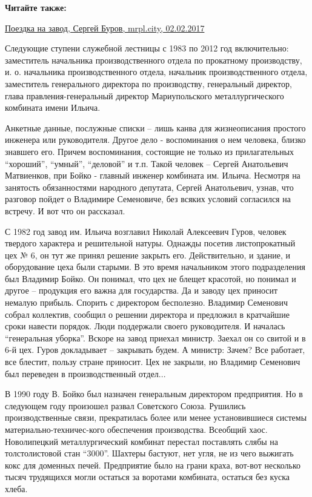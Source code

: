 \textbf{Читайте также:} 

\href{https://archive.org/details/02_02_2017.sergij_burov.mrpl_city.poezdka_na_zavod}{%
Поездка на завод, Сергей Буров, mrpl.city, 02.02.2017}

Следующие ступени служебной лестницы с 1983 по 2012 год включительно:
заместитель начальника производственного отдела по прокатному производству, и.
о. начальника производственного отдела,  начальник производственного отдела,
заместитель генерального директора по производству, генеральный директор, глава
правления-генеральный директор Мариупольского металлургического комбината имени
Ильича.

Анкетные данные, послужные списки – лишь канва для жизнеописания простого
инженера или руководителя. Другое дело - воспоминания о нем человека, близко
знавшего его. Причем воспоминания, состоящие не только из прилагательных
\enquote{хороший}, \enquote{умный}, \enquote{деловой} и т.п. Такой  человек – Сергей Анатольевич
Матвиенков, при Бойко - главный инженер комбината им. Ильича.  Несмотря на
занятость обязанностями народного депутата, Сергей Анатольевич, узнав, что
разговор пойдет о Владимире Семеновиче, без всяких условий согласился на
встречу. И вот что он рассказал.

С 1982 год завод им. Ильича возглавил Николай Алексеевич Гуров, человек
твердого характера и решительной натуры. Однажды посетив листопрокатный цех №
6, он тут же принял решение закрыть его. Действительно, и здание, и
оборудование цеха были старыми. В это время начальником этого подразделения был
Владимир Бойко. Он понимал, что цех не блещет красотой, но понимал и другое –
продукция его важна для государства. Да и заводу цех приносит немалую прибыль.
Спорить с директором бесполезно. Владимир Семенович собрал коллектив, сообщил о
решении директора и предложил в кратчайшие сроки навести порядок. Люди
поддержали своего руководителя. И началась \enquote{генеральная уборка}. Вскоре на
завод приехал министр. Заехал он со свитой и в 6-й цех. Гуров докладывает –
закрывать будем. А министр: Зачем? Все работает, все блестит, пользу стране
приносит. Цех не закрыли, но Владимир Семенович был переведен в
производственный отдел...

В 1990 году В. Бойко был назначен генеральным директором предприятия. Но в
следующем году произошел развал Советского Союза. Рушились производственные
связи, прекратилась более или менее установившиеся системы
материально-техничес\hyp{}кого обеспечения производства. Всеобщий хаос. Новолипецкий
металлургический комбинат перестал поставлять слябы на толстолистовой стан
\enquote{3000}. Шахтеры бастуют, нет угля, не из чего выжигать кокс для доменных
печей. Предприятие было на грани краха, вот-вот несколько тысяч трудящихся
могли остаться за воротами комбината, остаться без куска хлеба.

